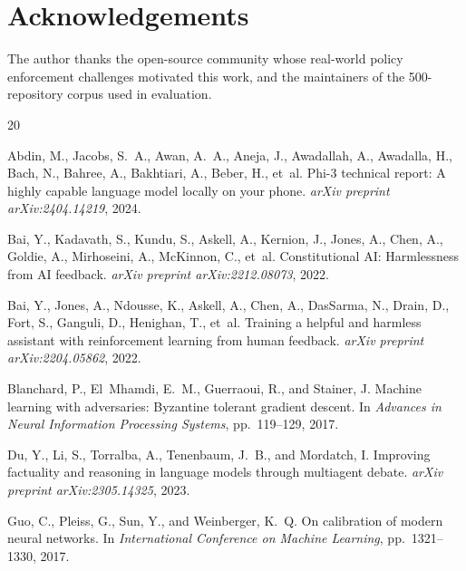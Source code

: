 \documentclass[11pt,a4paper]{article}
\begin{document}
\section*{Acknowledgements}

The author thanks the open-source community whose real-world
policy enforcement challenges motivated this work, and the
maintainers of the 500-repository corpus used in evaluation.



\begin{thebibliography}{20}

Abdin, M., Jacobs, S.~A., Awan, A.~A., Aneja, J., Awadallah, A.,
Awadalla, H., Bach, N., Bahree, A., Bakhtiari, A., Beber, H., et~al.
\newblock Phi-3 technical report: A highly capable language model locally
on your phone.
\newblock \emph{arXiv preprint arXiv:2404.14219}, 2024.

Bai, Y., Kadavath, S., Kundu, S., Askell, A., Kernion, J., Jones, A.,
Chen, A., Goldie, A., Mirhoseini, A., McKinnon, C., et~al.
\newblock Constitutional {AI}: Harmlessness from {AI} feedback.
\newblock \emph{arXiv preprint arXiv:2212.08073}, 2022.

Bai, Y., Jones, A., Ndousse, K., Askell, A., Chen, A., DasSarma, N.,
Drain, D., Fort, S., Ganguli, D., Henighan, T., et~al.
\newblock Training a helpful and harmless assistant with reinforcement
learning from human feedback.
\newblock \emph{arXiv preprint arXiv:2204.05862}, 2022.

Blanchard, P., El~Mhamdi, E.~M., Guerraoui, R., and Stainer, J.
\newblock Machine learning with adversaries: {B}yzantine tolerant
gradient descent.
\newblock In \emph{Advances in Neural Information Processing Systems},
pp.~119--129, 2017.

Du, Y., Li, S., Torralba, A., Tenenbaum, J.~B., and Mordatch, I.
\newblock Improving factuality and reasoning in language models through
multiagent debate.
\newblock \emph{arXiv preprint arXiv:2305.14325}, 2023.

Guo, C., Pleiss, G., Sun, Y., and Weinberger, K.~Q.
\newblock On calibration of modern neural networks.
\newblock In \emph{International Conference on Machine Learning},
pp.~1321--1330, 2017.


\end{thebibliography}
\end{document}
